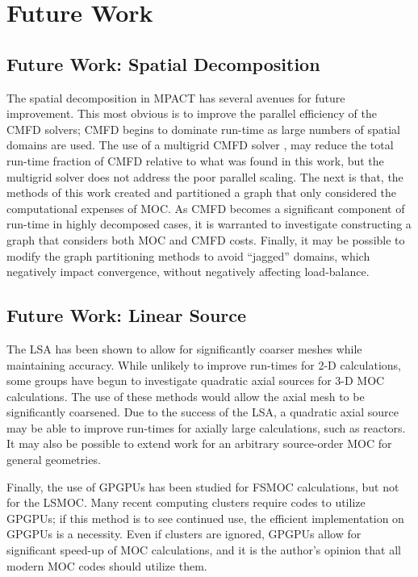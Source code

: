 {  \section{Future Work}{\label{sec:Future Work}
    \subsection{Future Work: Spatial Decomposition}{\label{ssec:Future Work:Spatial Decomposition}
      The spatial decomposition in MPACT has several avenues for future improvement.
      This most obvious is to improve the parallel efficiency of the \ac{CMFD} solvers; \ac{CMFD} begins to dominate run-time as large numbers of spatial domains are used.
      The use of a multigrid \ac{CMFD} solver \cite{Yee2018}, may reduce the total run-time fraction of \ac{CMFD} relative to what was found in this work, but the multigrid solver does not address the poor parallel scaling.
      The next is that, the methods of this work created and partitioned a graph that only considered the computational expenses of \ac{MOC}.
      As \ac{CMFD} becomes a significant component of run-time in highly decomposed cases, it is warranted to investigate constructing a graph that considers both \ac{MOC} and \ac{CMFD} costs.
      Finally, it may be possible to modify the graph partitioning methods to avoid ``jagged'' domains, which negatively impact convergence, without negatively affecting load-balance.
    }

    \subsection{Future Work: Linear Source}{\label{ssec:Future Work:Linear Source}
      The \ac{LSA} has been shown to allow for significantly coarser meshes while maintaining accuracy.
      While unlikely to improve run-times for 2-D calculations, some groups have begun to investigate quadratic axial sources for 3-D \ac{MOC} calculations. %
      The use of these methods would allow the axial mesh to be significantly coarsened.
      Due to the success of the \ac{LSA}, a quadratic axial source may be able to improve run-times for axially large calculations, such as reactors.
      It may also be possible to extend  work for an arbitrary source-order \ac{MOC} for general geometries.

      Finally, the use of \acp{GPGPU} has been studied for \ac{FSMOC} calculations, but not for the \ac{LSMOC}. %
      Many recent computing clusters require codes to utilize \acp{GPGPU}; if this method is to see continued use, the efficient implementation on \acp{GPGPU} is a necessity.
      Even if clusters are ignored, \acp{GPGPU} allow for significant speed-up of \ac{MOC} calculations, and it is the author's opinion that all modern \ac{MOC} codes should utilize them.
    }

}}
